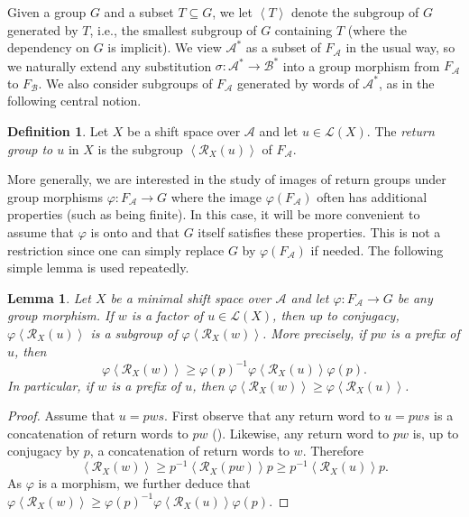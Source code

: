 \documentclass{amsart}
\newcommand*{\ret}{\mathcal{R}}
\newcommand*{\lang}{\mathcal{L}}
\newcommand*{\cA}{\mathcal{A}}
\newcommand*{\cB}{\mathcal{B}}
\newcommand*{\from}{\colon}
\newcommand*{\gen}[1]{\left\langle #1\right\rangle}
\theoremstyle{plain}
\newtheorem{lemma}[theorem]{Lemma}
\theoremstyle{definition}
\newtheorem{definition}[theorem]{Definition}
\theoremstyle{remark}
\begin{document}
Given a group $G$ and a subset $T \subseteq G$, we let $\gen{T}$ denote the subgroup of $G$ generated by $T$, i.e., the smallest subgroup of $G$ containing $T$ (where the dependency on $G$ is implicit). We view $\cA^*$ as a subset of $F_\cA$ in the usual way, so we naturally extend any substitution $\sigma\from \cA^* \to \cB^*$ into a group morphism from $F_\cA$ to $F_\cB$. We also consider subgroups of $F_\cA$ generated by words of $\cA^*$, as in the following central notion.
\begin{definition}
    Let $X$ be a shift space over $\cA$ and let $u \in \lang(X)$. The \emph{return group to $u$} in $X$ is the subgroup $\gen{\ret_X(u)}$ of $F_\cA$.
\end{definition}

More generally, we are interested in the study of images of return groups under group morphisms $\varphi\from F_\cA\to G$ where the image $\varphi(F_\cA)$ often has additional properties (such as being finite). In this case, it will be more convenient to assume that $\varphi$ is onto and that $G$ itself satisfies these properties. This is not a restriction since one can simply replace $G$ by $\varphi(F_\cA)$ if needed. The following simple lemma is used repeatedly.

\begin{lemma}\label{lem:return groups of factors}
    Let $X$ be a minimal shift space over $\cA$ and let $\varphi\from F_\cA\to G$ be any group morphism. If $w$ is a factor of $u \in \lang(X)$, then up to conjugacy, $\varphi\gen{\ret_X(u)}$ is a subgroup of $\varphi\gen{\ret_X(w)}$. More precisely, if $pw$ is a prefix of $u$, then
    \begin{equation*}
        \varphi\gen{\ret_X(w)} \geq \varphi(p)^{-1}\varphi\gen{\ret_X(u)}\varphi(p).
    \end{equation*}
    In particular, if $w$ is a prefix of $u$, then $\varphi\gen{\ret_X(w)} \geq \varphi\gen{\ret_X(u)}$.
\end{lemma}

\begin{proof}
    Assume that $u = pws$. First observe that any return word to $u = pws$ is a concatenation of return words to $pw$ (\cite[Proposition~2.6, part~4]{Durand1998}). Likewise, any return word to $pw$ is, up to conjugacy by $p$, a concatenation of return words to $w$. Therefore
    \begin{equation*}
        \gen{\ret_X(w)} \geq p^{-1}\gen{\ret_X(pw)} p \geq p^{-1}\gen{\ret_X(u)} p.
    \end{equation*}
    As $\varphi$ is a morphism, we further deduce that $\varphi\gen{\ret_X(w)} \geq \varphi(p)^{-1}\varphi\gen{\ret_X(u)}\varphi(p)$.
\end{proof}
\end{document}
